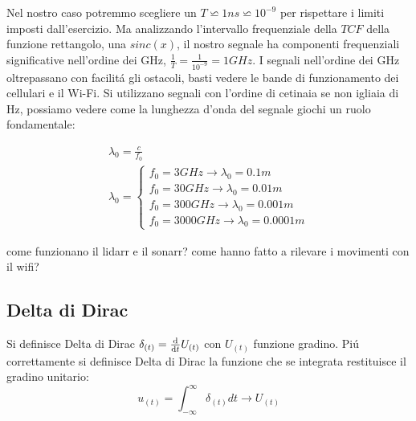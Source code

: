                 Nel nostro caso potremmo scegliere un $T\backsimeq 1ns \backsimeq 10^{-9}$ per rispettare i limiti imposti dall'esercizio.
                Ma analizzando l'intervallo frequenziale della $TCF$ della funzione rettangolo, una $sinc(x)$, il nostro segnale ha componenti
                frequenziali significative nell'ordine dei GHz, $\frac{1}{T}= \frac{1}{10^{-9}} = 1GHz$. I segnali nell'ordine dei GHz oltrepassano con facilitá
                gli ostacoli, basti vedere le bande di funzionamento dei cellulari e il Wi-Fi. Si utilizzano segnali con l'ordine di cetinaia se non igliaia di Hz, 
                possiamo vedere come la lunghezza d'onda del segnale giochi un ruolo fondamentale:
                
                \begin{gather}
                        \lambda_0 = \frac{c}{f_0} \nonumber \\
                        \lambda_0 = \begin{cases}
                            f_0 = 3GHz \rightarrow \lambda_0 = 0.1m \nonumber \\
                            f_0 = 30GHz \rightarrow \lambda_0 = 0.01m \nonumber \\
                            f_0 = 300GHz \rightarrow \lambda_0 = 0.001m \nonumber \\
                            f_0 = 3000GHz \rightarrow \lambda_0 = 0.0001m \nonumber 
                        \end{cases}\nonumber
                \end{gather}

            come funzionano il lidarr e il sonarr? come hanno fatto a rilevare i movimenti con il wifi?
    \subsection{Delta di Dirac}
        Si definisce Delta di Dirac $\delta_{(t)} = \derivative{}{t}U_{(t)}$ con $U_{(t)}$ funzione gradino.
        Piú correttamente si definisce Delta di Dirac la funzione che se integrata restituisce il gradino unitario:
        \[
            u_{(t)} = \int_{-\infty}^{\infty} \delta_{(t)} dt \rightarrow U_{(t)}
        \]


